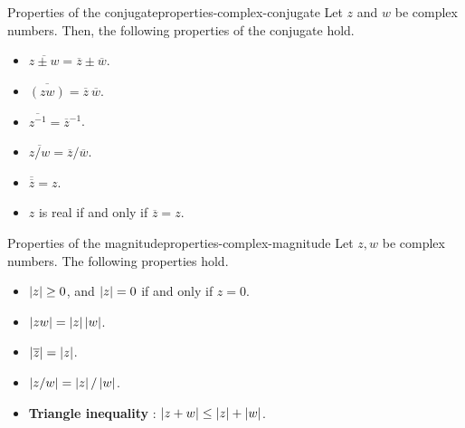 \begin{proposition}{Properties of the conjugate}{properties-complex-conjugate}
  Let $z$ and $w$ be complex numbers. Then, the following properties
  of the conjugate hold.%
  \begin{itemize}
  \item $\overline{z\pm w} = \overline{z} \pm \overline{w}$.
  \item $\overline{(zw)} = \overline{z}~ \overline{w}$.
  \item $\overline{z^{-1}} = \overline{z}^{-1}$.
  \item $\overline{z/w} = \overline{z} / \overline{w}$.
  \item $\overline{\overline{z}}=z$.
  \item $z$ is real if and only if $\overline{z}=z$.
  \end{itemize}
\end{proposition}

\begin{proposition}{Properties of the magnitude}{properties-complex-magnitude}
  Let $z,w$ be complex numbers.  The following properties hold.%
  \begin{itemize}
  \item $\left|z\right| \geq 0$, and $\left|z\right|=0$ if and only if $z=0$.
  \item $\left|zw\right| = \left|z\right|\left|w\right|$.
  \item $\left|\overline{z}\right| = \left|z\right|$.
  \item $\left|z/w\right| = \left|z\right|/\left|w\right|$.
  \item \textbf{Triangle inequality}%
    :
    $\left|z+w\right| \leq \left|z\right| +\left|w\right|$.
  \end{itemize}
\end{proposition}
